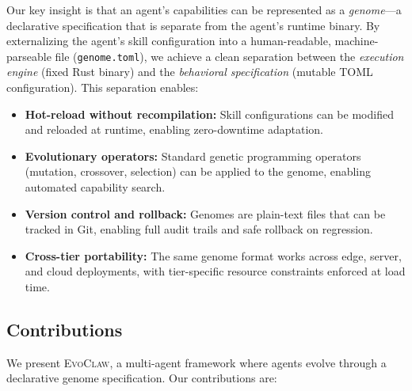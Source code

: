 \documentclass{article}
\newcommand{\evoclaw}{\textsc{EvoClaw}}
\newcommand{\genome}{\texttt{genome.toml}}
\begin{document}
Our key insight is that an agent's capabilities can be represented as a \textit{genome}---a declarative specification that is separate from the agent's runtime binary. By externalizing the agent's skill configuration into a human-readable, machine-parseable file (\genome{}), we achieve a clean separation between the \textit{execution engine} (fixed Rust binary) and the \textit{behavioral specification} (mutable TOML configuration). This separation enables:

\begin{itemize}[leftmargin=*]
    \item \textbf{Hot-reload without recompilation:} Skill configurations can be modified and reloaded at runtime, enabling zero-downtime adaptation.
    \item \textbf{Evolutionary operators:} Standard genetic programming operators (mutation, crossover, selection) can be applied to the genome, enabling automated capability search.
    \item \textbf{Version control and rollback:} Genomes are plain-text files that can be tracked in Git, enabling full audit trails and safe rollback on regression.
    \item \textbf{Cross-tier portability:} The same genome format works across edge, server, and cloud deployments, with tier-specific resource constraints enforced at load time.
\end{itemize}


\subsection{Contributions}

We present \evoclaw{}, a multi-agent framework where agents evolve through a declarative genome specification. Our contributions are:
\end{document}

